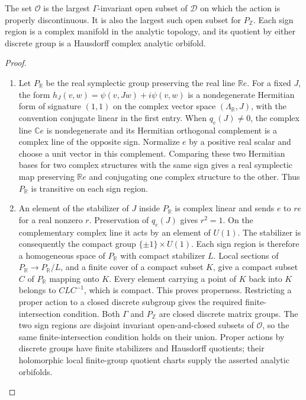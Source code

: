 \begin{theorem}\hypertarget{tag-01RC}{}\label{fam:src:F.2.2}\label{fam:st:F.2.2}

The set $\mathcal O$ is the largest $\Gamma$-invariant open subset of
$\mathcal D$ on which the action is properly discontinuous.  It is also
the largest such open subset for $P_{\mathbb Z}$.  Each sign region is
a complex manifold in the analytic topology, and its quotient by either
discrete group is a Hausdorff complex analytic orbifold.
\end{theorem}



\begin{proof}
\begin{enumerate}[label=\arabic*.,leftmargin=*]
\item Let $P_{\mathbb R}$ be the real symplectic group preserving the real line
$\mathbb Re$.  For a fixed
$J$, the form
$h_J(v,w)=\psi(v,Jw)+i\psi(v,w)$ is a nondegenerate Hermitian form of
signature $(1,1)$ on the complex vector space $(\Lambda_{\mathbb R},J)$,
with the convention conjugate linear in the first entry.  When
$q_e(J)\ne0$, the complex line $\mathbb Ce$ is nondegenerate and its
Hermitian orthogonal complement is a complex line of the opposite sign.
Normalize $e$ by a positive real scalar and choose a unit vector in this
complement.  Comparing these two Hermitian bases for two complex
structures with the same sign gives a real symplectic map preserving
$\mathbb Re$ and conjugating one complex structure to the other.  Thus
$P_{\mathbb R}$ is transitive on each sign region.

\item An element of the stabilizer of $J$ inside $P_{\mathbb R}$ is complex
linear and sends $e$ to $r e$ for a real nonzero $r$.  Preservation of
$q_e(J)$ gives $r^2=1$.  On the complementary complex line it acts by an
element of $U(1)$.  The stabilizer is consequently the compact group
$\{\pm1\}\times U(1)$.  Each sign region is therefore a homogeneous
space of $P_{\mathbb R}$ with compact stabilizer $L$.  Local sections of
$P_{\mathbb R}\to P_{\mathbb R}/L$, and a finite cover of a compact
subset $K$, give a compact subset $C$ of $P_{\mathbb R}$ mapping onto
$K$.  Every element carrying a point of $K$ back into $K$ belongs to
$CLC^{-1}$, which is compact.  This proves properness.  Restricting a
proper action to a closed discrete subgroup gives
the required finite-intersection condition.  Both $\Gamma$ and
$P_{\mathbb Z}$ are closed discrete matrix groups.  The two sign regions
are disjoint invariant open-and-closed subsets of $\mathcal O$, so the
same finite-intersection condition holds on their union.  Proper actions
by discrete groups have finite stabilizers and Hausdorff quotients; their
holomorphic local finite-group quotient charts supply the asserted
analytic orbifolds.


\end{enumerate}
\end{proof}
